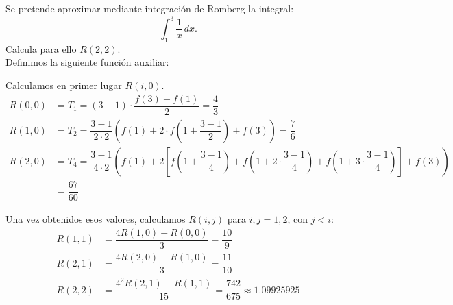 \documentclass[12pt]{article}
\author{Arturo Olivares Martos}
\date{\today}
\begin{document}
    {\color{blue}

    \renewcommand{\headrulewidth}{1pt}
    \renewcommand{\headrule}{\hbox to\headwidth{%
    \color{blue}\leaders\hrule height \headrulewidth\hfill}}
    
    \begin{ejercicio}
        Se pretende aproximar mediante integración de Romberg la integral:
        \begin{equation*}
            \int_1^3 \frac{1}{x} \, dx.
        \end{equation*}
        Calcula para ello \( R(2, 2) \).\\

        Definimos la siguiente función auxiliar:

        Calculamos en primer lugar \( R(i, 0) \).
        \begin{align*}
            R(0, 0) &= T_1 = (3-1)\cdot \dfrac{f(3)-f(1)}{2}
            = \dfrac{4}{3}\\
            R(1, 0) &= T_2 = \dfrac{3-1}{2\cdot 2}\left(f(1)+2\cdot f\left(1+\dfrac{3-1}{2}\right)+f(3)\right)
            = \dfrac{7}{6}\\
            R(2, 0) &= T_{4} = \dfrac{3-1}{4\cdot 2}\left(f(1)+2\left[f\left(1+\dfrac{3-1}{4}\right)+f\left(1+2\cdot \dfrac{3-1}{4}\right)+f\left(1+3\cdot \dfrac{3-1}{4}\right)\right]+f(3)\right)
            \\&= \dfrac{67}{60}
        \end{align*}

        Una vez obtenidos esos valores, calculamos \( R(i, j) \) para \( i,j=1,2 \), con $ j < i $:
        \begin{align*}
            R(1, 1) &= \dfrac{4R(1,0)-R(0,0)}{3} = \dfrac{10}{9}\\
            R(2, 1) &= \dfrac{4R(2,0)-R(1,0)}{3} = \dfrac{11}{10}\\
            R(2, 2) &= \dfrac{4^2R(2,1)-R(1,1)}{15} = \dfrac{742}{675}\approx 1.09925925
        \end{align*}
    \end{ejercicio}

}
\end{document}
